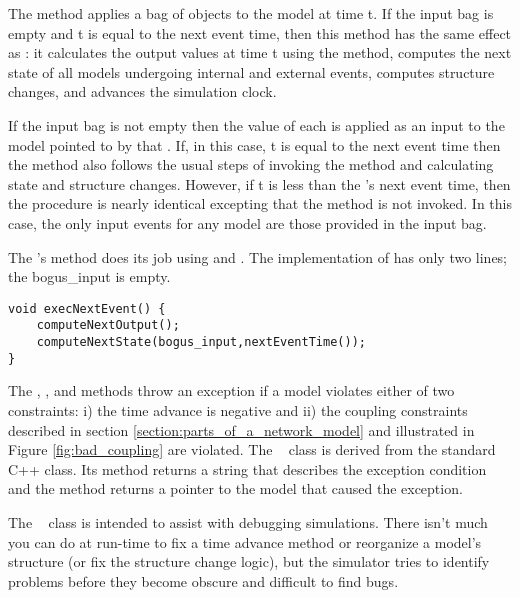 The  method applies a bag of  objects to the model at time t. If the input bag is empty and t is equal to the next event time, then this method has the same effect as : it calculates the output values at time t using the  method, computes the next state of all models undergoing internal and external events, computes structure changes, and advances the simulation clock.

If the input bag is not empty then the value of each  is applied as an input to the model pointed to by that . If, in this case, t is equal to the next event time then the method also follows the usual steps of invoking the  method and calculating state and structure changes. However, if t is less than the 's next event time, then the procedure is nearly identical excepting that the  method is not invoked. In this case, the only input events for any model are those provided in the input bag.

The 's  method does its job using  and . The implementation of  has only two lines; the  bogus\_input is empty.
\begin{verbatim}
void execNextEvent() {
    computeNextOutput();
    computeNextState(bogus_input,nextEventTime());
}
\end{verbatim}

The , , and  methods throw an exception if a model violates either of two constraints: i) the time advance is negative and ii) the coupling constraints described in section \ref{section:parts_of_a_network_model} and illustrated in Figure \ref{fig:bad_coupling} are violated. The \adevs\  class is derived from the standard C++  class. Its method  returns a string that describes the exception condition and the method  returns a pointer to the model that caused the exception.

The \adevs\  class is intended to assist with debugging simulations. There isn't much you can do at run-time to fix a time advance method or reorganize a model's structure (or fix the structure change logic), but the simulator tries to identify problems before they become obscure and difficult to find bugs.
